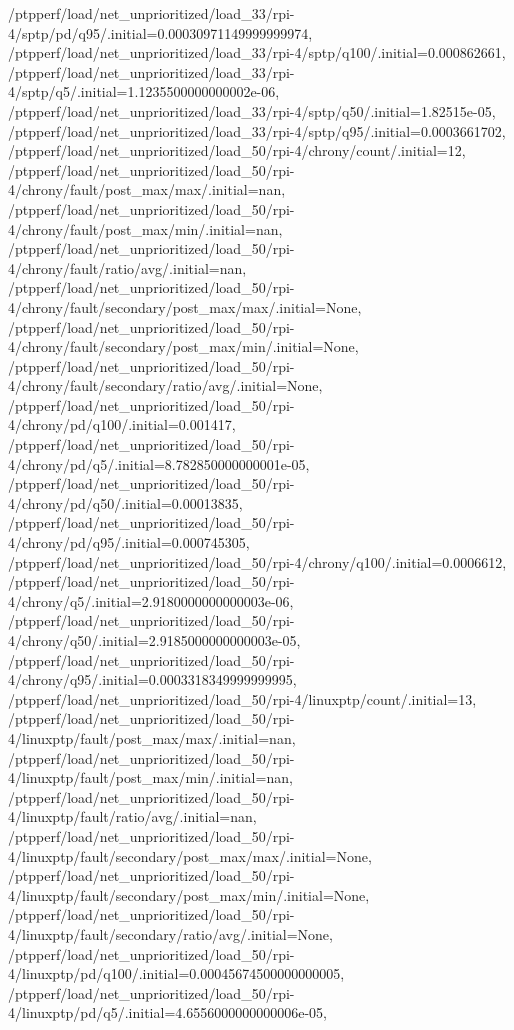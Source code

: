 {    /ptpperf/load/net_unprioritized/load_33/rpi-4/sptp/pd/q95/.initial=0.00030971149999999974,
    /ptpperf/load/net_unprioritized/load_33/rpi-4/sptp/q100/.initial=0.000862661,
    /ptpperf/load/net_unprioritized/load_33/rpi-4/sptp/q5/.initial=1.1235500000000002e-06,
    /ptpperf/load/net_unprioritized/load_33/rpi-4/sptp/q50/.initial=1.82515e-05,
    /ptpperf/load/net_unprioritized/load_33/rpi-4/sptp/q95/.initial=0.0003661702,
    /ptpperf/load/net_unprioritized/load_50/rpi-4/chrony/count/.initial=12,
    /ptpperf/load/net_unprioritized/load_50/rpi-4/chrony/fault/post_max/max/.initial=nan,
    /ptpperf/load/net_unprioritized/load_50/rpi-4/chrony/fault/post_max/min/.initial=nan,
    /ptpperf/load/net_unprioritized/load_50/rpi-4/chrony/fault/ratio/avg/.initial=nan,
    /ptpperf/load/net_unprioritized/load_50/rpi-4/chrony/fault/secondary/post_max/max/.initial=None,
    /ptpperf/load/net_unprioritized/load_50/rpi-4/chrony/fault/secondary/post_max/min/.initial=None,
    /ptpperf/load/net_unprioritized/load_50/rpi-4/chrony/fault/secondary/ratio/avg/.initial=None,
    /ptpperf/load/net_unprioritized/load_50/rpi-4/chrony/pd/q100/.initial=0.001417,
    /ptpperf/load/net_unprioritized/load_50/rpi-4/chrony/pd/q5/.initial=8.782850000000001e-05,
    /ptpperf/load/net_unprioritized/load_50/rpi-4/chrony/pd/q50/.initial=0.00013835,
    /ptpperf/load/net_unprioritized/load_50/rpi-4/chrony/pd/q95/.initial=0.000745305,
    /ptpperf/load/net_unprioritized/load_50/rpi-4/chrony/q100/.initial=0.0006612,
    /ptpperf/load/net_unprioritized/load_50/rpi-4/chrony/q5/.initial=2.9180000000000003e-06,
    /ptpperf/load/net_unprioritized/load_50/rpi-4/chrony/q50/.initial=2.9185000000000003e-05,
    /ptpperf/load/net_unprioritized/load_50/rpi-4/chrony/q95/.initial=0.0003318349999999995,
    /ptpperf/load/net_unprioritized/load_50/rpi-4/linuxptp/count/.initial=13,
    /ptpperf/load/net_unprioritized/load_50/rpi-4/linuxptp/fault/post_max/max/.initial=nan,
    /ptpperf/load/net_unprioritized/load_50/rpi-4/linuxptp/fault/post_max/min/.initial=nan,
    /ptpperf/load/net_unprioritized/load_50/rpi-4/linuxptp/fault/ratio/avg/.initial=nan,
    /ptpperf/load/net_unprioritized/load_50/rpi-4/linuxptp/fault/secondary/post_max/max/.initial=None,
    /ptpperf/load/net_unprioritized/load_50/rpi-4/linuxptp/fault/secondary/post_max/min/.initial=None,
    /ptpperf/load/net_unprioritized/load_50/rpi-4/linuxptp/fault/secondary/ratio/avg/.initial=None,
    /ptpperf/load/net_unprioritized/load_50/rpi-4/linuxptp/pd/q100/.initial=0.00045674500000000005,
    /ptpperf/load/net_unprioritized/load_50/rpi-4/linuxptp/pd/q5/.initial=4.6556000000000006e-05,
}
